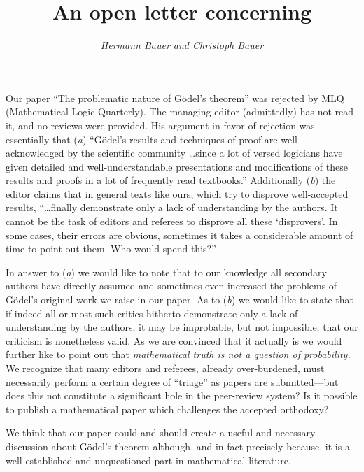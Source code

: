 \documentclass[11pt]{article}
\begin{document}
\title{\bf An open letter concerning \\
}
\author{\large\em Hermann Bauer and Christoph Bauer }

\date{} %

\maketitle
\thispagestyle{empty}

Our paper ``The problematic nature of G\"{o}del's theorem'' was rejected by MLQ (Mathematical Logic Quarterly). The managing editor (admittedly) has not read it, and no reviews were provided.  His argument in favor of rejection was essentially that ({\em a}) ``G\"{o}del's results and techniques of proof are well-acknowledged by the scientific community \ldots since a lot of versed logicians have given detailed and well-understandable presentations and modifications of these results and proofs in a lot of frequently read textbooks.'' Additionally ({\em b}) the editor claims that in general texts like ours, which try to disprove well-accepted results, ``\ldots finally demonstrate only a lack of understanding by the authors.  It cannot be the task of editors and referees to disprove all these `disprovers'. In some cases, their errors are obvious, sometimes it takes a considerable amount of time to point out them. Who would spend this?''

In answer to ({\em a}) we would like to note that to our knowledge all secondary authors have directly assumed and sometimes even increased the problems of G\"{o}del's original work we raise in our paper. As to ({\em b}) we would like to state that if indeed all or most such critics hitherto demonstrate only a lack of understanding by the authors, it may be improbable, but not impossible, that our criticism is nonetheless valid. As we are convinced that it actually is we would further like to point out that {\em mathematical truth is not a question of probability.}  We recognize that many editors and referees, already over-burdened, must necessarily perform a certain degree of ``triage'' as papers are submitted---but does this not constitute a significant hole in the peer-review system?  Is it possible to publish a mathematical paper which challenges the accepted orthodoxy?

We think that our paper could and should create a useful and necessary discussion about G\"{o}del's theorem although, and in fact precisely because, it is a well established and unquestioned part in mathematical literature.
\end{document}
